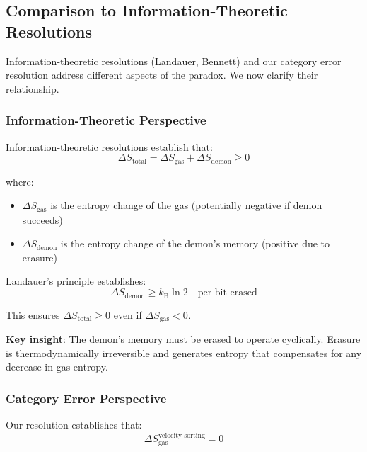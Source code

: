 \documentclass[10pt,twocolumn,letterpaper]{article}
\theoremstyle{definition}
\theoremstyle{remark}
\newcommand{\kb}{k_\text{B}}
\begin{document}
\subsection{Comparison to Information-Theoretic Resolutions}

Information-theoretic resolutions (Landauer, Bennett) and our category error resolution address different aspects of the paradox. We now clarify their relationship.

\subsubsection{Information-Theoretic Perspective}

Information-theoretic resolutions establish that:
\begin{equation}
\Delta S_{\text{total}} = \Delta S_{\text{gas}} + \Delta S_{\text{demon}} \geq 0
\label{eq:info_theory_resolution}
\end{equation}

where:
\begin{itemize}
\item $\Delta S_{\text{gas}}$ is the entropy change of the gas (potentially negative if demon succeeds)
\item $\Delta S_{\text{demon}}$ is the entropy change of the demon's memory (positive due to erasure)
\end{itemize}

Landauer's principle establishes:
\begin{equation}
\Delta S_{\text{demon}} \geq \kb \ln 2 \quad \text{per bit erased}
\label{eq:landauer}
\end{equation}

This ensures $\Delta S_{\text{total}} \geq 0$ even if $\Delta S_{\text{gas}} < 0$.

\textbf{Key insight}: The demon's memory must be erased to operate cyclically. Erasure is thermodynamically irreversible and generates entropy that compensates for any decrease in gas entropy.

\subsubsection{Category Error Perspective}

Our resolution establishes that:
\begin{equation}
\Delta S_{\text{gas}}^{\text{velocity sorting}} = 0
\label{eq:category_resolution}
\end{equation}
\end{document}
